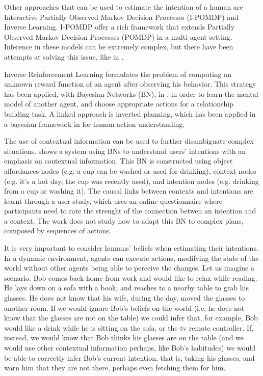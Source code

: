 Other approaches that can be used to estimate the intention of a human are Interactive Partially Observed Markov Decision Processes (I-POMDP) and Inverse Learning. I-POMDP  \cite{gmytrasiewicz2004interactive} offer a rich framework that extends Partially Observed Markov Decision Processes (POMDP) in a multi-agent setting. Inference in these models can be extremely complex, but there have been attempts at solving this issue, like in \cite{doshi2009monte,hoang2013interactive}. 

Inverse Reinforcement Learning \cite{ng2000algorithms} formulates the problem of computing an unknown reward function of an agent after observing his behavior. This strategy has been applied, with Bayesian Networks (BN), in \cite{Nagai2015}, in order to learn the mental model of another agent, and choose appropriate actions for a relationship building task. A linked approach is inverted planning, which has been applied in a bayesian framework in \cite{baker2009action}  for human action understanding.

The use of contextual information can be used to further disambiguate complex situations. \cite{Liu2014} shows a system using BNs to understand users' intentions with an emphasis on contextual information. This BN is constructed using object affordances nodes (e.g. a cup can be washed or used for drinking), context nodes (e.g. it's a hot day, the cup was recently used), and intention nodes (e.g. drinking from a cup or washing it). The causal links between contexts and intentions are learnt through a user study, which uses an online questionnaire where participants need to rate the strenght of the connection betwen an intention and a context. The work does not study how to adapt this BN to complex plans, composed by sequences of actions.

It is very important to consider humans' beliefs when estimating their intentions. In a dynamic environment, agents can execute actions, modifying the state of the world without other agents being able to perceive the changes. Let us imagine a scenario. Bob comes back home from work and would like to relax while reading. He lays down on a sofa with a book, and reaches to a nearby table to grab his glasses. He does not know that his wife, during the day, moved the glasses to another room. If we would ignore Bob's beliefs on the world (i.e. he does not know that the glasses are not on the table) we could infer that, for example, Bob would like a drink while he is sitting on the sofa, or the tv remote controller. If, instead, we would know that Bob thinks his glasses are on the table (and we would use other contextual information perhaps, like Bob's habitudes) we would be able to correctly infer Bob's current intention, that is, taking his glasses, and warn him that they are not there, perhaps even fetching them for him. 

